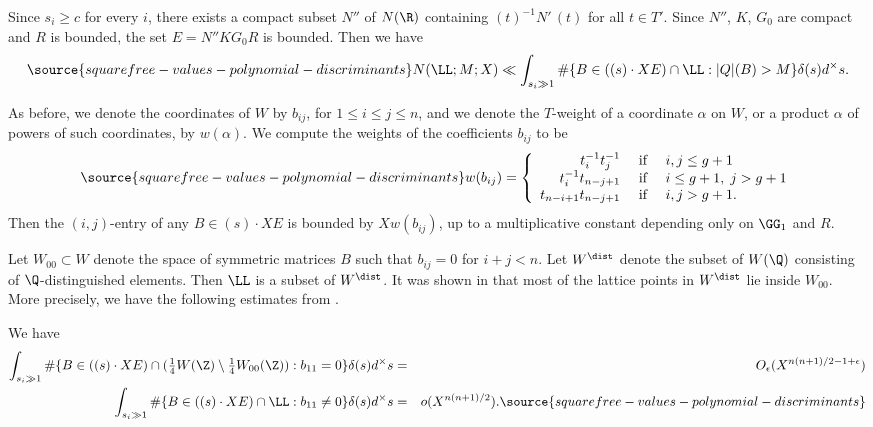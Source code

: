 Since $s_i\geq c$ for every $i$, there exists a compact subset $N''$ of
$N(\R)$ containing $(t)^{-1}N'\,(t)$ for all $t\in T'$. Since $N''$, $K$, $G_0$ are compact and $R$ is bounded, the set $E=N''KG_0R$ is bounded. Then we have
\begin{equation}\label{eq:REe}
\source{squarefree-values-polynomial-discriminants}
N(\LL;M;X)\ll \int_{s_i\gg 1} \#\{B\in((s)\cdot XE)\cap\LL:|Q|(B)>M\}\delta(s)d^\times s.
\end{equation}

As before, we denote the coordinates of $W$ by $b_{ij}$, for $1\leq
i\leq j\leq n$, and we denote
the $T$-weight of a coordinate $\alpha$ on $W$, or a
product $\alpha$ of powers of such coordinates, by $w(\alpha)$.
We compute the weights of the coefficients $b_{ij}$ to be
\begin{equation}\label{wbij2}
\source{squarefree-values-polynomial-discriminants}
w(b_{ij})=\left\{
\begin{array}{rcl}
t_i^{-1}t_j^{-1} &\mbox{ if }& i,j\leq g+1\\
t_i^{-1}t_{n-j+1} &\mbox{ if }& i\leq g+1,\; j>g+1\\
t_{n-i+1}t_{n-j+1} &\mbox{ if }& i,j>g+1.
\end{array}
\right.
\end{equation}
Then the $(i,j)$-entry of any $B\in (s)\cdot XE$ is bounded by $Xw(b_{ij})$, up to a multiplicative constant depending only on $\GG_1$ and $R$.

Let $W_{00}\subset W$ denote the space of symmetric matrices $B$
such that $b_{ij}=0$ for $i+j < n$. Let $W^\dist$ denote the subset of $W(\Q)$ consisting of $\Q$-distinguished elements. Then $\LL$ is a subset of $W^\dist$. It was shown in \cite[\S4.2]{SW}
that most of the lattice points in $W^\dist$ lie inside $W_{00}$. More precisely, we have the following estimates from \cite[Proposition 21 and 23]{SW}.

\begin{proposition}
\notready\label{prop:sw6}
We have
\begin{eqnarray}
  \int_{s_i\gg 1} \#\{B\in((s)\cdot XE)\cap({\textstyle\frac14} W(\Z)\setminus{\textstyle\frac14} W_{00}(\Z)):b_{11}=0\}\delta(s)d^\times s &=& O_\epsilon(X^{n(n+1)/2-1+\epsilon}) \\
  \label{eq:selbergpree}\int_{s_i\gg 1} \#\{B\in((s)\cdot XE)\cap\LL:b_{11}\neq 0\}\delta(s)d^\times s &=& o(X^{n(n+1)/2}).
\source{squarefree-values-polynomial-discriminants}
\end{eqnarray}
\end{proposition}

